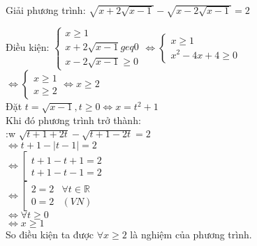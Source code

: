 \begin{baitap}
 Giải phương trình: $ \sqrt{x + 2 \sqrt{x-1} } - \sqrt{x -2 \sqrt{x-1 } } =2   $
\begin{loigiai1}
Điều kiện: $ \begin{cases}
    x \geq 1 \\
    x + 2 \sqrt{x-1 } geq 0 \\
    x - 2 \sqrt{x -1 } \geq 0 
\end{cases} \Leftrightarrow 
\begin{cases}
    x \geq 1 \\
    x^2 -4x + 4 \geq 0 
\end{cases} $ \\
$ \Leftrightarrow \begin{cases}
    x \geq 1 \\
    x \geq 2 
\end{cases} \Leftrightarrow x \geq 2
$\\
Đặt $ t = \sqrt{x-1 } , t \geq 0 \Leftrightarrow x= t^2 +1 $ \\
Khi đó phương trình trở thành: \\:w
$ \sqrt{t+1 +2t } - \sqrt{t+1 -2t } =2 $ \\
$ \Leftrightarrow t + 1 - | t -1 | =2 $ \\
$ \Leftrightarrow \left[
    \begin{array}{l}
        t + 1 - t + 1 =2  \\
        t + 1 -t -1 =2 
    \end{array}
\right. $ \\
$ \Leftrightarrow \left[
    \begin{array}{lr}
        2 = 2 & \forall t \in \mathbb{R} \\
        0=2 & (VN)
    \end{array}
\right. $ \\
$ \Leftrightarrow \forall t \geq 0 $\\
$ \Leftrightarrow x \geq 1 $ \\
So điều kiện ta được $ \forall  x \geq 2 $ là nghiệm của phương trình.


\end{loigiai1}

\end{baitap}
